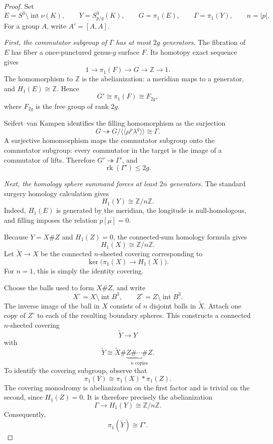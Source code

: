 \documentclass[11pt]{article}
\newcommand{\Z}{\mathbb{Z}}
\newcommand{\surg}[2]{S^3_{#1}(#2)}
\DeclareMathOperator{\rk}{rk}
\DeclareMathOperator{\intt}{int}
\begin{document}
\begin{proof}
Set
\[
    E=S^3\setminus\intt\nu(K),\qquad
    Y=\surg{p/q}{K},\qquad
    G=\pi_1(E),\qquad
    \Gamma=\pi_1(Y),\qquad
    n=|p|.
\]
For a group \(A\), write \(A'=[A,A]\).

\medskip
\noindent\emph{First, the commutator subgroup of \(\Gamma\) has at most
\(2g\) generators.}
The fibration of \(E\) has fiber a once-punctured genus-\(g\) surface
\(F\). Its homotopy exact sequence gives
\[
    1\longrightarrow\pi_1(F)
      \longrightarrow G
      \longrightarrow\Z
      \longrightarrow 1.
\]
The homomorphism to \(\Z\) is the abelianization: a meridian maps to a
generator, and \(H_1(E)\cong\Z\). Hence
\[
    G'\cong\pi_1(F)\cong F_{2g},
\]
where \(F_{2g}\) is the free group of rank \(2g\).

Seifert--van Kampen identifies the filling homomorphism as the
surjection
\[
    G\twoheadrightarrow
    G/\langle\!\langle\mu^p\lambda^q\rangle\!\rangle
    \cong\Gamma.
\]
A surjective homomorphism maps the commutator subgroup onto the
commutator subgroup: every commutator in the target is the image of
a commutator of lifts. Therefore \(G'\twoheadrightarrow\Gamma'\),
and
\begin{equation}\label{eq:upper-rank}
    \rk(\Gamma')\leq 2g.
\end{equation}

\medskip
\noindent\emph{Next, the homology sphere summand forces at least \(2n\)
generators.}
The standard surgery homology calculation gives
\begin{equation}\label{eq:surgery-homology}
    H_1(Y)\cong\Z/n\Z.
\end{equation}
Indeed, \(H_1(E)\) is generated by the meridian, the longitude is
null-homologous, and filling imposes the relation \(p[\mu]=0\).

Because \(Y=X\# Z\) and \(H_1(Z)=0\), the connected-sum homology
formula gives
\[
    H_1(X)\cong\Z/n\Z.
\]
Let \(\widetilde X\to X\) be the connected \(n\)-sheeted covering
corresponding to
\[
    \ker\bigl(\pi_1(X)\longrightarrow H_1(X)\bigr).
\]
For \(n=1\), this is simply the identity covering.

Choose the balls used to form \(X\# Z\), and write
\[
    X^\circ=X\setminus\intt B^3,\qquad
    Z^\circ=Z\setminus\intt B^3.
\]
The inverse image of the ball in \(X\) consists of \(n\) disjoint
balls in \(\widetilde X\). Attach one copy of \(Z^\circ\) to each of
the resulting boundary spheres. This constructs a connected
\(n\)-sheeted covering
\[
    \widetilde Y\longrightarrow Y
\]
with
\begin{equation}\label{eq:cover-sum}
    \widetilde Y\cong
    \widetilde X\#
    \underbrace{Z\#\cdots\# Z}_{n\text{ copies}}.
\end{equation}
To identify the covering subgroup, observe that
\[
    \pi_1(Y)\cong\pi_1(X)*\pi_1(Z).
\]
The covering monodromy is abelianization on the first factor and is
trivial on the second, since \(H_1(Z)=0\). It is therefore precisely
the abelianization
\[
    \Gamma\longrightarrow H_1(Y)\cong\Z/n\Z.
\]
Consequently,
\[
    \pi_1(\widetilde Y)\cong\Gamma'.
\]


\end{proof}
\end{document}
